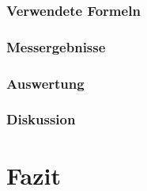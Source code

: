 \documentclass[12px]{scrartcl}
\begin{document}
\subsubsection{Verwendete Formeln}
\subsubsection{Messergebnisse}
\subsubsection{Auswertung}
\subsubsection{Diskussion}

\section{Fazit}

\end{document}
